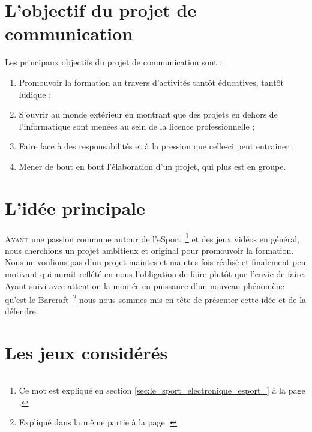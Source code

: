 \section{L'objectif du projet de communication}%
\label{sec:l_objectif_du_projet_de_communication}

Les principaux objectifs du projet de communication sont :

\begin{enumerate}

\item Promouvoir la formation au travers d'activités tantôt éducatives,
tantôt ludique ;

\item S'ouvrir au monde extérieur en montrant que des projets en dehors
de l'informatique sont menées au sein de la licence professionnelle ;

\item Faire face à des responsabilités et à la pression que celle-ci
peut entrainer ;

\item Mener de bout en bout l'élaboration d'un projet, qui plus est en
groupe.

\end{enumerate}

\section{L'idée principale}
\label{sec:l_idee_principale}

\lettrine{A}{yant} une passion commune autour de l'eSport\, \footnote{Ce
mot est expliqué en section \ref{sec:le_sport_electronique_esport_} à la
page \pageref{sec:le_sport_electronique_esport_}.} et des jeux vidéos en
général, nous cherchions un projet ambitieux et original pour promouvoir
la formation.  Nous ne voulions pas d'un projet maintes et maintes fois
réalisé et finalement peu motivant qui aurait reflété en nous
l'obligation de faire plutôt que l'envie de faire.  Ayant suivi avec
attention la montée en puissance d'un nouveau phénomène qu'est le
Barcraft\, \footnote{Expliqué dans la même partie à la page
\pageref{sec:barcraft}.} nous nous sommes mis en tête de présenter cette
idée et de la défendre.

\section{Les jeux considérés}%
\label{sec:les_jeux_consideres}

